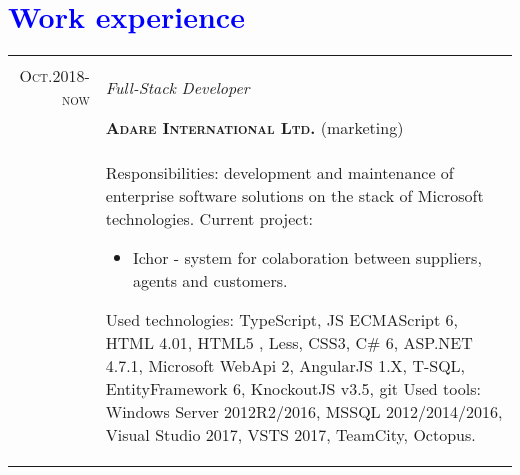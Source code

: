 \documentclass[a4paper,12pt]{article}
\begin{document}
\vspace{3em}
\section{\textcolor{Blue}{Work experience}}
\begin{tabular}{r|p{12cm}}
	\multicolumn{2}{c}{}\\
	\textsc{Oct.2018-now}
	&\emph{Full-Stack Developer} \\
	&\textsc{\textbf{Adare International Ltd.}} (marketing) \\
	&\footnotesize{
		Responsibilities: development and maintenance of enterprise software solutions on the stack of Microsoft technologies. \newline
		Current project:
		\begin{itemize}
			\item Ichor - system for colaboration between suppliers, agents and customers.
		\end{itemize}
		Used technologies: \newline
		TypeScript, JS ECMAScript 6, HTML 4.01, HTML5 , Less, CSS3, C\# 6, ASP.NET 4.7.1, Microsoft WebApi 2, AngularJS 1.X, T-SQL,
		EntityFramework 6, KnockoutJS v3.5, git \newline
		Used tools: \newline
		Windows Server 2012R2/2016, MSSQL 2012/2014/2016, Visual Studio 2017, VSTS 2017, TeamCity, Octopus.
	}\\
	
\end{tabular}
\end{document}
